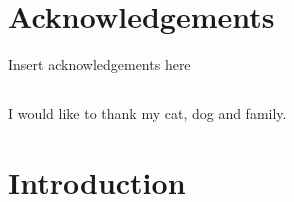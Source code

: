 \documentclass[12pt,a4paper]{article}
\begin{document}
\tableofcontents %
\newpage

\listoftables
\newpage

\listoffigures
\newpage

\section*{Acknowledgements}
Insert acknowledgements here
\subsection*{}
	I would like to thank my cat, dog and family.
\newpage

\setcounter{page}{1}

\section{Introduction} 
\end{document}
